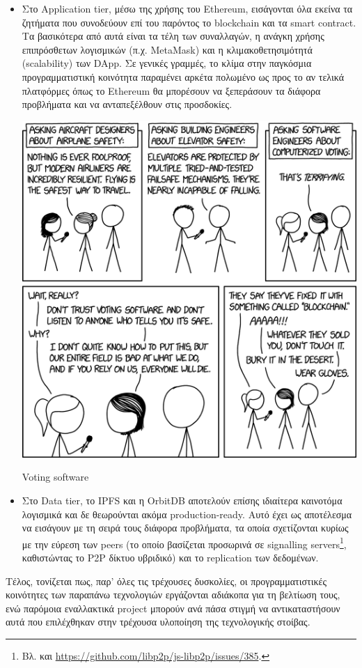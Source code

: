 \begin{itemize}
	\item Στο Application tier, μέσω της χρήσης του Ethereum, εισάγονται όλα εκείνα τα ζητήματα που συνοδεύουν επί του παρόντος το blockchain και τα smart contract. Τα βασικότερα από αυτά είναι τα τέλη των συναλλαγών, η ανάγκη χρήσης επιπρόσθετων λογισμικών (π.χ. MetaMask) και η κλιμακοθετησιμότητά (scalability) των DApp. Σε γενικές γραμμές, το κλίμα στην παγκόσμια προγραμματιστική κοινότητα παραμένει αρκέτα πολωμένο ως προς το αν τελικά πλατφόρμες όπως το Ethereum θα μπορέσουν να ξεπεράσουν τα διάφορα προβλήματα και να ανταπεξέλθουν στις προσδοκίες.

	\begin{enumitemcenteredfigure}
		\includegraphics[width=.50\textwidth]{assets/figures/chapter-5/5.1.xkcd_2030_voting_software}
		\caption[Voting software]{Voting software\footnotemark}
	\end{enumitemcenteredfigure}

	\item Στο Data tier, το IPFS και η OrbitDB αποτελούν επίσης ιδιαίτερα καινοτόμα λογισμικά και δε θεωρούνται ακόμα production-ready. Αυτό έχει ως αποτέλεσμα να εισάγουν με τη σειρά τους διάφορα προβλήματα, τα οποία σχετίζονται κυρίως με την εύρεση των peers (το οποίο βασίζεται προσωρινά σε signalling servers\footnote{Βλ. και \url{https://github.com/libp2p/js-libp2p/issues/385}.}, καθιστώντας το P2P δίκτυο υβριδικό) και το replication των δεδομένων.
\end{itemize}

Τέλος, τονίζεται πως, παρ' όλες τις τρέχουσες δυσκολίες, οι προγραμματιστικές κοινότητες των παραπάνω τεχνολογιών εργάζονται αδιάκοπα για τη βελτίωση τους, ενώ παρόμοια εναλλακτικά project μπορούν ανά πάσα στιγμή να αντικαταστήσουν αυτά που επιλέχθηκαν στην τρέχουσα υλοποίηση της τεχνολογικής στοίβας.
